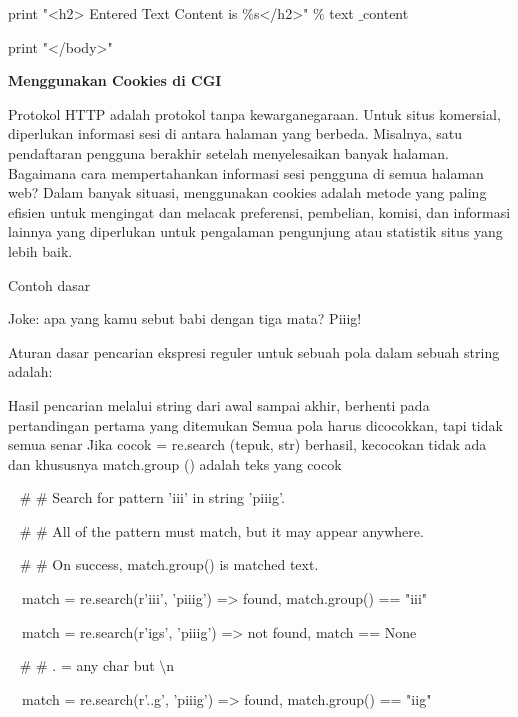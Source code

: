 \begin {enumerate}
\noindent 
print "<h2> Entered Text Content is  $  \%  $s</h2>"  $  \%  $ text $  \_  $content \par
\noindent 
print "</body>" \par
\vspace{12pt}
\noindent 
{\fontsize{14pt}{14pt}\selectfont \textbf{Menggunakan Cookies di CGI} \\} \par
\noindent 
Protokol HTTP adalah protokol tanpa kewarganegaraan. Untuk situs komersial, diperlukan informasi sesi di antara halaman yang berbeda. Misalnya, satu pendaftaran pengguna berakhir setelah menyelesaikan banyak halaman. Bagaimana cara mempertahankan informasi sesi pengguna di semua halaman web? Dalam banyak situasi, menggunakan cookies adalah metode yang paling efisien untuk mengingat dan melacak preferensi, pembelian, komisi, dan informasi lainnya yang diperlukan untuk pengalaman pengunjung atau statistik situs yang lebih baik. \par
\noindent 
Contoh dasar \par
\noindent 
Joke: apa yang kamu sebut babi dengan tiga mata? Piiig! \par
\vspace{12pt}
\noindent 
Aturan dasar pencarian ekspresi reguler untuk sebuah pola dalam sebuah string adalah: \par
\noindent 
Hasil pencarian melalui string dari awal sampai akhir, berhenti pada pertandingan pertama yang ditemukan  Semua pola harus dicocokkan, tapi tidak semua senar Jika cocok = re.search (tepuk, str) berhasil, kecocokan tidak ada dan khususnya match.group () adalah teks yang cocok \par
\vspace{12pt}
\noindent 
~  $  \#  $ $  \#  $ Search for pattern 'iii' in string 'piiig'. \par
\noindent 
~  $  \#  $ $  \#  $ All of the pattern must match, but it may appear anywhere. \par
\noindent 
~  $  \#  $ $  \#  $ On success, match.group() is matched text. \par
\noindent 
~~match = re.search(r'iii', 'piiig') =>  found, match.group() == "iii" \par
\noindent 
~~match = re.search(r'igs', 'piiig') =>  not found, match == None \par
\vspace{12pt}
\noindent 
~  $  \#  $ $  \#  $ . = any char but  $  \setminus  $n \par
\noindent 
~~match = re.search(r'..g', 'piiig') =>  found, match.group() == "iig" \par

\end{enumerate}
